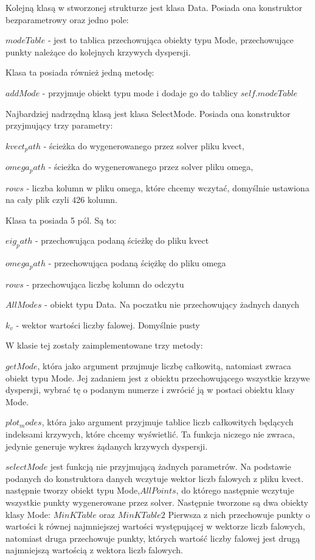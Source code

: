 Kolejną klasą w stworzonej strukturze jest klasa Data. Posiada ona konstruktor bezparametrowy oraz jedno pole:

$modeTable$ - jest to tablica przechowująca obiekty typu Mode, przechowujące punkty należące do kolejnych krzywych dyspersji.

Klasa ta posiada również jedną metodę:

$addMode$ - przyjmuje obiekt typu mode i dodaje go do tablicy $self.modeTable$

Najbardziej nadrzędną klasą jest klasa SelectMode. Posiada ona konstruktor przyjmujący trzy parametry: 

$kvect_path$ - ścieżka do wygenerowanego przez solver pliku kvect, 

$omega_path$ - ścieżka do wygenerowanego przez solver pliku omega, 

$rows$ - liczba kolumn w pliku omega, które chcemy wczytać, domyślnie ustawiona na cały plik czyli 426 kolumn.

Klasa ta posiada 5 pól. Są to:

$eig_path$ - przechowująca podaną ścieżkę do pliku kvect

$omega_path$ - przechowująca podaną ściężkę do pliku omega

$rows$ - przechowująca liczbę kolumn do odczytu

$AllModes$ - obiekt typu Data. Na poczatku nie przechowujący żadnych danych

$k_v$ - wektor wartości liczby falowej. Domyślnie pusty

W klasie tej zostały zaimplementowane trzy metody:

$getMode$, która jako argument przujmuje liczbę całkowitą, natomiast zwraca obiekt typu Mode. Jej zadaniem jest z obiektu przechowującego wszystkie krzywe dyspersji, wybrać tę o podanym numerze i zwrócić ją w postaci obiektu klasy Mode.

$plot_modes$, która jako argument przyjmuje tablice liczb całkowitych będących indeksami krzywych, które chcemy wyświetlić. Ta funkcja niczego nie zwraca, jedynie generuje wykres żądanych krzywych dyspersji.

$selectMode$ jest funkcją nie przyjmującą żadnych parametrów. Na podstawie podanych do konstruktora danych wczytuje wektor liczb falowych z pliku kvect. następnie tworzy obiekt typu Mode,$AllPoints$, do którego następnie wczytuje wszystkie punkty wygenerowane przez solver. Następnie tworzone są dwa obiekty klasy Mode: $MinKTable$ oraz $MinKTable2$ Pierwsza z nich przechowuje punkty o wartości k równej najmniejszej wartości występującej w wektorze liczb falowych, natomiast druga przechowuje punkty, których wartość liczby falowej jest drugą najmniejszą wartością z wektora liczb falowych.

